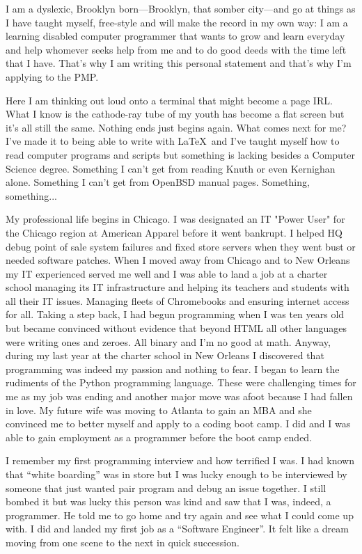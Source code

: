 \documentclass{article}
\begin{document}
I am a dyslexic, Brooklyn born---Brooklyn, that somber city---and go at things as I have taught myself, free-style and will make the record in my own way: I am a learning disabled computer programmer that wants to grow and learn everyday and help whomever seeks help from me and to do good deeds with the time left that I have. That's why I am writing this personal statement and that's why I'm applying to the PMP.

Here I am thinking out loud onto a terminal that might become a page IRL. What I know is the cathode-ray tube of my youth has become a flat screen but it's all still the same. Nothing ends just begins again. What comes next for me? I've made it to being able to write with \LaTeX\ and I've taught myself how to read computer programs and scripts but something is lacking besides a Computer Science degree. Something I can't get from reading Knuth or even Kernighan alone. Something I can't get from OpenBSD manual pages. Something, something...

My professional life begins in Chicago. I was designated an IT "Power User" for the Chicago region at American Apparel before it went bankrupt. I helped HQ debug point of sale system failures and fixed store servers when they went bust or needed software patches. When I moved away from Chicago and to New Orleans my IT experienced served me well and I was able to land a job at a charter school managing its IT infrastructure and helping its teachers and students with all their IT issues. Managing fleets of Chromebooks and ensuring internet access for all. Taking a step back, I had begun programming when I was ten years old but became convinced without evidence that beyond HTML  all other languages were writing ones and zeroes. All binary and I'm no good at math. Anyway, during my last year at the charter school in New Orleans I discovered that programming was indeed my passion and nothing to fear. I began to learn the rudiments of the Python programming language. These were challenging times for me as my job was ending and another major move was afoot because I had fallen in love. My future wife was moving to Atlanta to gain an MBA and she convinced me to better myself and apply to a coding boot camp. I did and I was able to gain employment as a programmer before the boot camp ended.

I remember my first programming interview and how terrified I was. I had known that ``white boarding'' was in store but I was lucky enough to be interviewed by someone that just wanted pair program and debug an issue together. I still bombed it but was lucky this person was kind and saw that I was, indeed, a programmer. He told me to go home and try again and see what I could come up with. I did and landed my first job as a ``Software Engineer''. It felt like a dream moving from one scene to the next in quick succession.
\end{document}
